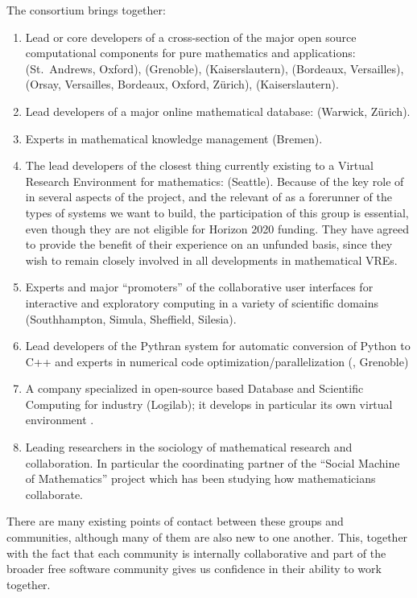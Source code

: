 \documentclass[noworkareas,deliverables,keys]{euproposal}                  %
\begin{document}
\begin{proposal}
The consortium brings together:
\begin{enumerate}
\item \label{mathsoftware} Lead or core developers of a cross-section of the major open
  source computational components for pure mathematics and applications: \GAP (St.~Andrews,
  Oxford), \Linbox (Grenoble), \MPIR (Kaiserslautern), \Pari (Bordeaux, Versailles), \Sage
  (Orsay, Versailles, Bordeaux, Oxford, Zürich), \Singular (Kaiserslautern).
\item \label{mathdb} Lead developers of a major online mathematical database: \LMFDB
  (Warwick, Zürich).
\item \label{mathknowledge} Experts in mathematical knowledge management (Bremen).
\item \label{smc} The lead developers of the closest thing currently existing to a Virtual
  Research Environment for mathematics: \SMC (Seattle). Because of the key role of \Sage
  in several aspects of the project, and the relevant of \SMC as a forerunner of the types
  of systems we want to build, the participation of this group is essential, even though
  they are not eligible for Horizon 2020 funding. They have agreed to provide the benefit
  of their experience on an unfunded basis, since they wish to remain closely involved in
  all developments in mathematical VREs.
\item \label{jupyter} Experts and major ``promoters'' of the \Jupyter collaborative user
  interfaces for interactive and exploratory computing in a variety of scientific domains
  (Southhampton, Simula, Sheffield, Silesia).
\item \label{pythran} Lead developers of the Pythran system for automatic conversion of
  Python to C++ and experts in numerical code optimization/parallelization (,
  Grenoble)
\item \label{logilab} A company specialized in open-source based Database and Scientific
  Computing for industry (Logilab); it develops in particular its own virtual environment
  \Simulagora.
\item \label{social} Leading researchers in the sociology of mathematical research and
  collaboration. In particular the coordinating partner of the ``Social Machine of
  Mathematics'' project which has been studying how mathematicians collaborate.
\end{enumerate}





There are many existing points of contact between these groups  and
communities, although many of them are also new to one another. This,
together with the fact that each community is internally collaborative
and part of the broader free software community gives us confidence in
their ability to work together.


\end{proposal}
\end{document}
